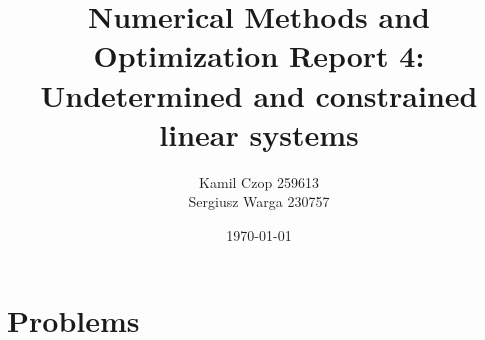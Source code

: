 \documentclass[a4paper]{article}
\title{Numerical Methods and Optimization Report 4:
Undetermined and constrained linear systems}
\author{Kamil Czop 259613\\Sergiusz Warga 230757}
\date{\today}
\begin{document}
\maketitle
\tableofcontents
\pagebreak

\section{Problems}





\clearpage

\nocite{Zdunek, GoluVanl96}


\end{document}
